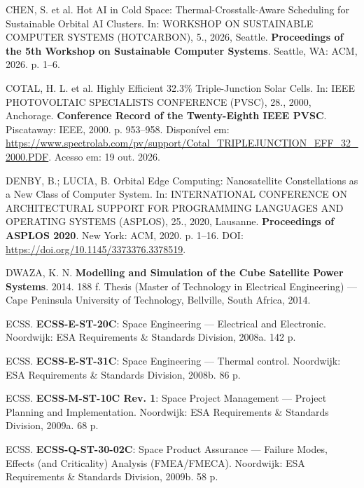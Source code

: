 \vspace{0.2cm}
\noindent CHEN, S. et al. Hot AI in Cold Space: Thermal-Crosstalk-Aware Scheduling for Sustainable Orbital AI Clusters. In: WORKSHOP ON SUSTAINABLE COMPUTER SYSTEMS (HOTCARBON), 5., 2026, Seattle. \textbf{Proceedings of the 5th Workshop on Sustainable Computer Systems}. Seattle, WA: ACM, 2026. p. 1--6.

\vspace{0.2cm}
\noindent COTAL, H. L. et al. Highly Efficient 32.3\% Triple-Junction Solar Cells. In: IEEE PHOTOVOLTAIC SPECIALISTS CONFERENCE (PVSC), 28., 2000, Anchorage. \textbf{Conference Record of the Twenty-Eighth IEEE PVSC}. Piscataway: IEEE, 2000. p. 953--958. Disponível em: \url{https://www.spectrolab.com/pv/support/Cotal_TRIPLEJUNCTION_EFF_32_2000.PDF}. Acesso em: 19 out. 2026.

\vspace{0.2cm}
\noindent DENBY, B.; LUCIA, B. Orbital Edge Computing: Nanosatellite Constellations as a New Class of Computer System. In: INTERNATIONAL CONFERENCE ON ARCHITECTURAL SUPPORT FOR PROGRAMMING LANGUAGES AND OPERATING SYSTEMS (ASPLOS), 25., 2020, Lausanne. \textbf{Proceedings of ASPLOS 2020}. New York: ACM, 2020. p. 1--16. DOI: \url{https://doi.org/10.1145/3373376.3378519}.

\vspace{0.2cm}
\noindent DWAZA, K. N. \textbf{Modelling and Simulation of the Cube Satellite Power Systems}. 2014. 188 f. Thesis (Master of Technology in Electrical Engineering) --- Cape Peninsula University of Technology, Bellville, South Africa, 2014.

\vspace{0.2cm}
\noindent ECSS. \textbf{ECSS-E-ST-20C}: Space Engineering --- Electrical and Electronic. Noordwijk: ESA Requirements \& Standards Division, 2008a. 142 p.

\vspace{0.2cm}
\noindent ECSS. \textbf{ECSS-E-ST-31C}: Space Engineering --- Thermal control. Noordwijk: ESA Requirements \& Standards Division, 2008b. 86 p.

\vspace{0.2cm}
\noindent ECSS. \textbf{ECSS-M-ST-10C Rev. 1}: Space Project Management --- Project Planning and Implementation. Noordwijk: ESA Requirements \& Standards Division, 2009a. 68 p.

\vspace{0.2cm}
\noindent ECSS. \textbf{ECSS-Q-ST-30-02C}: Space Product Assurance --- Failure Modes, Effects (and Criticality) Analysis (FMEA/FMECA). Noordwijk: ESA Requirements \& Standards Division, 2009b. 58 p.

